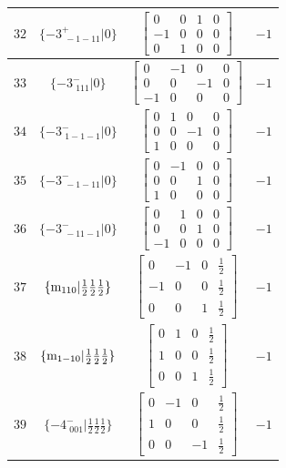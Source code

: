 \documentclass[fleqn,8pt]{jsarticle}
\begin{document}
\begin{longtable}{cccc}
$ 32 $ & $ \{-3^{+}_{\,\,-1-11}|0\} $ & $ \begin{bmatrix} 0 & 0 & 1 & 0 \\ -1 & 0 & 0 & 0 \\ 0 & 1 & 0 & 0 \end{bmatrix} $ & $ -1 $ \\ \hline
$ 33 $ & $ \{-3^{-}_{\,\,111}|0\} $ & $ \begin{bmatrix} 0 & -1 & 0 & 0 \\ 0 & 0 & -1 & 0 \\ -1 & 0 & 0 & 0 \end{bmatrix} $ & $ -1 $ \\ \hline
$ 34 $ & $ \{-3^{-}_{\,\,1-1-1}|0\} $ & $ \begin{bmatrix} 0 & 1 & 0 & 0 \\ 0 & 0 & -1 & 0 \\ 1 & 0 & 0 & 0 \end{bmatrix} $ & $ -1 $ \\ \hline
$ 35 $ & $ \{-3^{-}_{\,\,-1-11}|0\} $ & $ \begin{bmatrix} 0 & -1 & 0 & 0 \\ 0 & 0 & 1 & 0 \\ 1 & 0 & 0 & 0 \end{bmatrix} $ & $ -1 $ \\ \hline
$ 36 $ & $ \{-3^{-}_{\,\,-11-1}|0\} $ & $ \begin{bmatrix} 0 & 1 & 0 & 0 \\ 0 & 0 & 1 & 0 \\ -1 & 0 & 0 & 0 \end{bmatrix} $ & $ -1 $ \\ \hline
$ 37 $ & $ \{{\rm m}_{110}|\frac{1}{2} \frac{1}{2} \frac{1}{2}\} $ & $ \begin{bmatrix} 0 & -1 & 0 & \frac{1}{2} \\ -1 & 0 & 0 & \frac{1}{2} \\ 0 & 0 & 1 & \frac{1}{2} \end{bmatrix} $ & $ -1 $ \\ \hline
$ 38 $ & $ \{{\rm m}_{1-10}|\frac{1}{2} \frac{1}{2} \frac{1}{2}\} $ & $ \begin{bmatrix} 0 & 1 & 0 & \frac{1}{2} \\ 1 & 0 & 0 & \frac{1}{2} \\ 0 & 0 & 1 & \frac{1}{2} \end{bmatrix} $ & $ -1 $ \\ \hline
$ 39 $ & $ \{-4^{-}_{\,\,001}|\frac{1}{2} \frac{1}{2} \frac{1}{2}\} $ & $ \begin{bmatrix} 0 & -1 & 0 & \frac{1}{2} \\ 1 & 0 & 0 & \frac{1}{2} \\ 0 & 0 & -1 & \frac{1}{2} \end{bmatrix} $ & $ -1 $ \\ \hline

\end{longtable}
\end{document}
